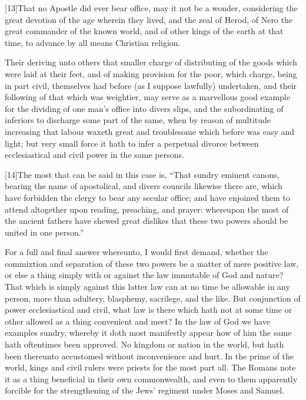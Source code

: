 [13]That no Apostle did ever bear office, may it not be a wonder, considering the great devotion of the age wherein they lived, and the zeal of Herod, of Nero the great commander of the known world, and of other kings of the earth at that time, to advance by all means Christian religion.

Their deriving unto others that smaller charge of distributing of the goods which were laid at their feet, and of making provision for the poor, which charge, being in part civil, themselves had before (as I suppose lawfully) undertaken, and their following of that which was weightier, may serve as a marvellous good example for the dividing of one man’s office into divers slips, and the subordinating of inferiors to discharge some part of the same, when by reason of multitude increasing that labour waxeth great and troublesome which before was easy and light; but very small force it hath to infer a perpetual divorce between ecclesiastical and civil power in the same persons.

[14]The most that can be said in this case is, “That sundry eminent canons, bearing the name of apostolical, and divers councils likewise there are, which have forbidden the  clergy to bear any secular office; and have enjoined them to attend altogether upon reading, preaching, and prayer: whereupon the most of the ancient fathers have shewed great dislikes that these two powers should be united in one person.”


For a full and final answer whereunto, I would first demand, whether the commixtion and separation of these two powers be a matter of mere positive law, or else a thing simply with or against the law immutable of God and nature? That which is simply against this latter law can at no time be allowable in any person, more than adultery, blasphemy, sacrilege, and the like. But conjunction of power ecclesiastical and civil, what law is there which hath not at some time or other allowed as a thing convenient and meet? In the law of God we have examples sundry, whereby it doth most manifestly appear how of him the same hath oftentimes been approved. No kingdom or nation in the world, but hath been thereunto accustomed without inconvenience and hurt. In the prime of the world, kings and civil rulers were priests for the most part all. The Romans note it as a thing beneficial in their own commonwealth, and even to them apparently forcible for the strengthening of the Jews’ regiment under Moses and Samuel.

